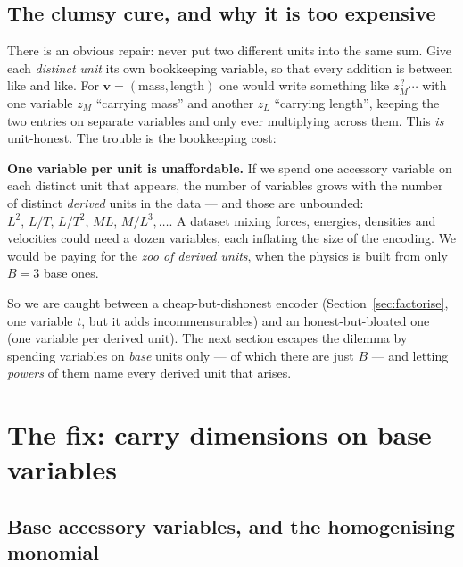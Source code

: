\documentclass[11pt,a4paper]{article}
\theoremstyle{definition}
\theoremstyle{plain}
\newcommand{\bvec}[1]{\mathbf{#1}}
\begin{document}
\subsection{The clumsy cure, and why it is too expensive}

There is an obvious repair: never put two different units into the same sum. Give
each \emph{distinct unit} its own bookkeeping variable, so that every addition is
between like and like. For $\bvec v=(\text{mass},\text{length})$ one would write
something like $z_M^{\,?}\cdots$ with one variable $z_M$ ``carrying mass'' and
another $z_L$ ``carrying length'', keeping the two entries on separate variables
and only ever multiplying across them. This \emph{is} unit-honest. The trouble is
the bookkeeping cost:

\begin{tcolorbox}[ideabox]
\textbf{One variable per unit is unaffordable.} If we spend one accessory variable
on each distinct unit that appears, the number of variables grows with the number
of distinct \emph{derived} units in the data --- and those are unbounded:
$L^2,\,L/T,\,L/T^2,\,ML,\,M/L^3,\dots$. A dataset mixing forces, energies,
densities and velocities could need a dozen variables, each inflating the size of
the encoding. We would be paying for the \emph{zoo of derived units}, when the
physics is built from only $B=3$ base ones.
\end{tcolorbox}

\noindent
So we are caught between a cheap-but-dishonest encoder (Section~\ref{sec:factorise},
one variable $t$, but it adds incommensurables) and an honest-but-bloated one (one
variable per derived unit). The next section escapes the dilemma by spending
variables on \emph{base} units only --- of which there are just $B$ --- and letting
\emph{powers} of them name every derived unit that arises.

\section{The fix: carry dimensions on base variables}
\label{sec:homog}

\subsection{Base accessory variables, and the homogenising monomial}
\end{document}
